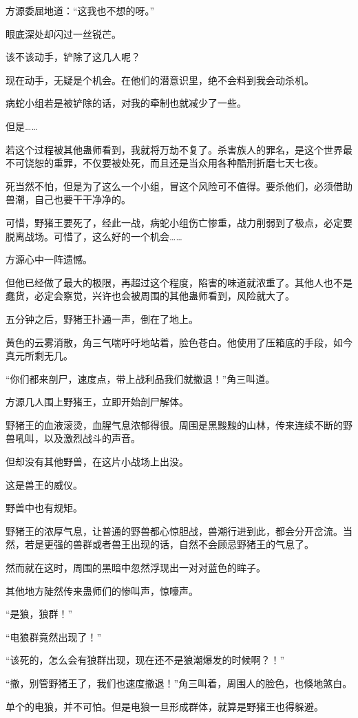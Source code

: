 \begin{this_body}
方源委屈地道：“这我也不想的呀。”

眼底深处却闪过一丝锐芒。

该不该动手，铲除了这几人呢？

现在动手，无疑是个机会。在他们的潜意识里，绝不会料到我会动杀机。

病蛇小组若是被铲除的话，对我的牵制也就减少了一些。

但是……

若这个过程被其他蛊师看到，我就将万劫不复了。杀害族人的罪名，是这个世界最不可饶恕的重罪，不仅要被处死，而且还是当众用各种酷刑折磨七天七夜。

死当然不怕，但是为了这么一个小组，冒这个风险可不值得。要杀他们，必须借助兽潮，自己也要干干净净的。

可惜，野猪王要死了，经此一战，病蛇小组伤亡惨重，战力削弱到了极点，必定要脱离战场。可惜了，这么好的一个机会……

方源心中一阵遗憾。

但他已经做了最大的极限，再超过这个程度，陷害的味道就浓重了。其他人也不是蠢货，必定会察觉，兴许也会被周围的其他蛊师看到，风险就大了。

五分钟之后，野猪王扑通一声，倒在了地上。

黄色的云雾消散，角三气喘吁吁地站着，脸色苍白。他使用了压箱底的手段，如今真元所剩无几。

“你们都来剖尸，速度点，带上战利品我们就撤退！”角三叫道。

方源几人围上野猪王，立即开始剖尸解体。

野猪王的血液滚烫，血腥气息浓郁得很。周围是黑黢黢的山林，传来连续不断的野兽吼叫，以及激烈战斗的声音。

但却没有其他野兽，在这片小战场上出没。

这是兽王的威仪。

野兽中也有规矩。

野猪王的浓厚气息，让普通的野兽都心惊胆战，兽潮行进到此，都会分开岔流。当然，若是更强的兽群或者兽王出现的话，自然不会顾忌野猪王的气息了。

然而就在这时，周围的黑暗中忽然浮现出一对对蓝色的眸子。

其他地方陡然传来蛊师们的惨叫声，惊嚎声。

“是狼，狼群！”

“电狼群竟然出现了！”

“该死的，怎么会有狼群出现，现在还不是狼潮爆发的时候啊？！”

“撤，别管野猪王了，我们也速度撤退！”角三叫着，周围人的脸色，也倏地煞白。

单个的电狼，并不可怕。但是电狼一旦形成群体，就算是野猪王也得躲避。


\end{this_body}
